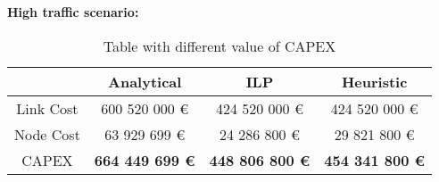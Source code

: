 \vspace{11pt}
\textbf{High traffic scenario:}\\

\begin{table}[h!]
\centering
\begin{tabular}{| c | c | c | c |}
 \hline
   & Analytical & ILP & Heuristic \\
 \hline\hline
 Link Cost & 600 520 000 \euro & 424 520 000 \euro & 424 520 000 \euro \\
 Node Cost & 63 929 699 \euro & 24 286 800 \euro & 29 821 800 \euro \\
 CAPEX & \textbf{664 449 699 \euro} & \textbf{448 806 800 \euro*} & \textbf{454 341 800 \euro} \\
 \hline
\end{tabular}
\caption{Table with different value of CAPEX }
\label{table_comparative_transp_protec_ref_3}
\end{table}

